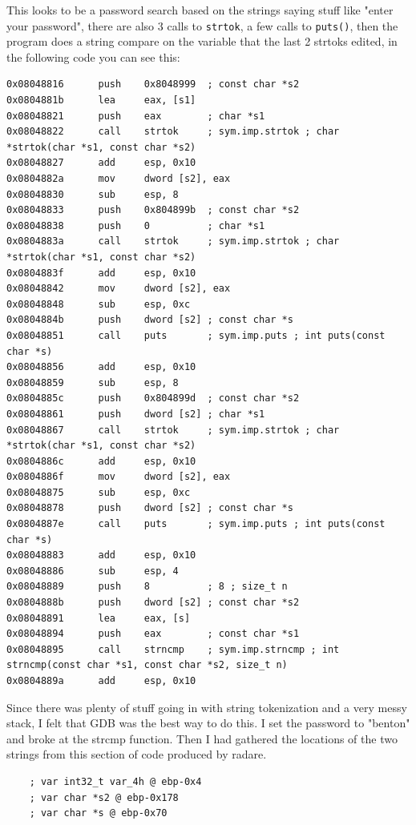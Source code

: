 \documentclass[11pt]{article}
\begin{document}
This looks to be a password search based on the strings saying stuff like "enter your password", there are also 3 calls to \texttt{strtok}, a few calls to \texttt{puts()}, then the program does a string compare on the variable that the last 2 strtoks edited, in the following code you can see this:

\begin{lstlisting}
0x08048816      push    0x8048999  ; const char *s2
0x0804881b      lea     eax, [s1]
0x08048821      push    eax        ; char *s1
0x08048822      call    strtok     ; sym.imp.strtok ; char *strtok(char *s1, const char *s2)
0x08048827      add     esp, 0x10
0x0804882a      mov     dword [s2], eax
0x08048830      sub     esp, 8
0x08048833      push    0x804899b  ; const char *s2
0x08048838      push    0          ; char *s1
0x0804883a      call    strtok     ; sym.imp.strtok ; char *strtok(char *s1, const char *s2)
0x0804883f      add     esp, 0x10
0x08048842      mov     dword [s2], eax
0x08048848      sub     esp, 0xc
0x0804884b      push    dword [s2] ; const char *s
0x08048851      call    puts       ; sym.imp.puts ; int puts(const char *s)
0x08048856      add     esp, 0x10
0x08048859      sub     esp, 8
0x0804885c      push    0x804899d  ; const char *s2
0x08048861      push    dword [s2] ; char *s1
0x08048867      call    strtok     ; sym.imp.strtok ; char *strtok(char *s1, const char *s2)
0x0804886c      add     esp, 0x10
0x0804886f      mov     dword [s2], eax
0x08048875      sub     esp, 0xc
0x08048878      push    dword [s2] ; const char *s
0x0804887e      call    puts       ; sym.imp.puts ; int puts(const char *s)
0x08048883      add     esp, 0x10
0x08048886      sub     esp, 4
0x08048889      push    8          ; 8 ; size_t n
0x0804888b      push    dword [s2] ; const char *s2
0x08048891      lea     eax, [s]
0x08048894      push    eax        ; const char *s1
0x08048895      call    strncmp    ; sym.imp.strncmp ; int strncmp(const char *s1, const char *s2, size_t n)
0x0804889a      add     esp, 0x10
\end{lstlisting}

Since there was plenty of stuff going in with string tokenization and a very messy stack, I felt that GDB was the best way to do this. I set the password to "benton" and broke at the strcmp function. Then I had gathered the locations of the two strings from this section of code produced by radare.
\begin{lstlisting}
    ; var int32_t var_4h @ ebp-0x4
    ; var char *s2 @ ebp-0x178
    ; var char *s @ ebp-0x70
\end{lstlisting}
\end{document}
